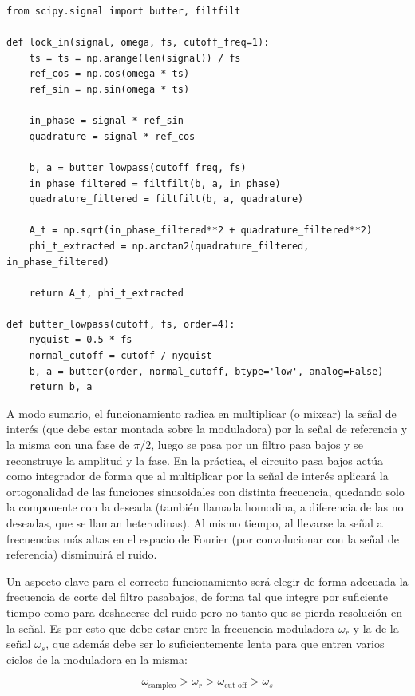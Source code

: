\begin{lstlisting}
from scipy.signal import butter, filtfilt	

def lock_in(signal, omega, fs, cutoff_freq=1):
	ts = ts = np.arange(len(signal)) / fs  
	ref_cos = np.cos(omega * ts)
	ref_sin = np.sin(omega * ts)
	
	in_phase = signal * ref_sin
	quadrature = signal * ref_cos
	
	b, a = butter_lowpass(cutoff_freq, fs)
	in_phase_filtered = filtfilt(b, a, in_phase)
	quadrature_filtered = filtfilt(b, a, quadrature)
	
	A_t = np.sqrt(in_phase_filtered**2 + quadrature_filtered**2)
	phi_t_extracted = np.arctan2(quadrature_filtered, in_phase_filtered)
	
	return A_t, phi_t_extracted
	
def butter_lowpass(cutoff, fs, order=4):
	nyquist = 0.5 * fs
	normal_cutoff = cutoff / nyquist
	b, a = butter(order, normal_cutoff, btype='low', analog=False)
	return b, a
\end{lstlisting} 

A modo sumario, el funcionamiento radica en multiplicar (o mixear) la señal de interés (que debe estar montada sobre la moduladora) por la señal de referencia y la misma con una fase de $ \pi/2 $, luego se pasa por un filtro pasa bajos y se reconstruye la amplitud y la fase. En la práctica, el circuito pasa bajos actúa como integrador de forma que al multiplicar por la señal de interés aplicará la ortogonalidad de las funciones sinusoidales con distinta frecuencia, quedando solo la componente con la deseada (también llamada homodina, a diferencia de las no deseadas, que se llaman heterodinas). Al mismo tiempo, al llevarse la señal a frecuencias más altas en el espacio de Fourier (por convolucionar con la señal de referencia) disminuirá el ruido.

Un aspecto clave para el correcto funcionamiento será elegir de forma adecuada la frecuencia de corte del filtro pasabajos, de forma tal que integre por suficiente tiempo como para deshacerse del ruido pero no tanto que se pierda resolución en la señal. Es por esto que debe estar entre la frecuencia moduladora $\omega_r$ y la de la señal $\omega_s$, que además debe ser lo suficientemente lenta para que entren varios ciclos de la moduladora en la misma:

\begin{equation}
	\omega_{\text{sampleo}} > \omega_r > \omega_{\text{cut-off}} > \omega_s 
\end{equation}

